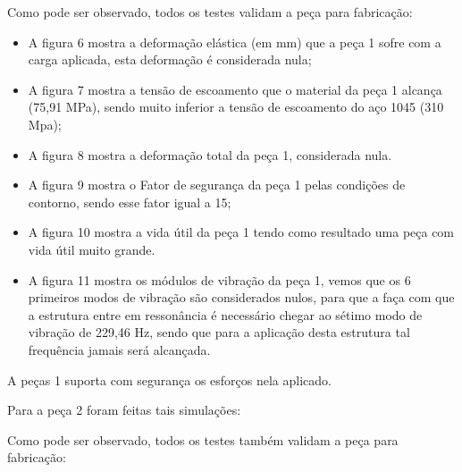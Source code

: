     Como pode ser observado, todos os testes validam a peça para fabricação:
    \begin{itemize}
        \item A figura 6 mostra a deformação elástica (em mm) que a peça 1 sofre com a carga aplicada, esta deformação é considerada nula;
        \item A figura 7 mostra a tensão de escoamento que o material da peça 1 alcança (75,91 MPa), sendo muito inferior a tensão de escoamento do aço 1045 (310 Mpa);
        \item A figura 8 mostra a deformação total da peça 1, considerada nula.
        \item A figura 9 mostra o Fator de segurança da peça 1 pelas condições de contorno, sendo esse fator igual a 15;
        \item A figura 10 mostra a vida útil da peça 1 tendo como resultado uma peça com vida útil muito grande.
        \item A figura 11 mostra os módulos de vibração da peça 1, vemos que os 6 primeiros modos de vibração são considerados nulos, para que a faça com que a estrutura entre em ressonância é necessário chegar ao sétimo modo de vibração de 229,46 Hz, sendo que para a aplicação desta estrutura tal frequência jamais será alcançada.
    \end{itemize}
    
    A peças 1 suporta com segurança os esforços nela aplicado.
 
    Para a peça 2 foram feitas tais simulações:
 
 
 
 
 
 
 
    Como pode ser observado, todos os testes também validam a peça para fabricação:
 
